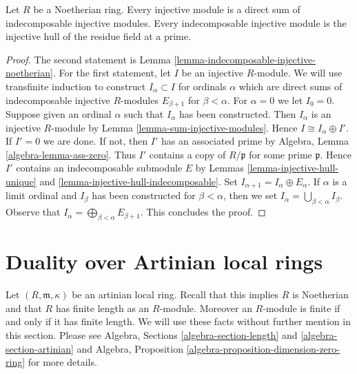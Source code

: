 \begin{proposition}
\label{proposition-structure-injectives-noetherian}
Let $R$ be a Noetherian ring.
Every injective module is a direct sum of indecomposable injective modules.
Every indecomposable injective module is the injective hull of
the residue field at a prime.
\end{proposition}

\begin{proof}
The second statement is Lemma \ref{lemma-indecomposable-injective-noetherian}.
For the first statement, let $I$ be an injective $R$-module.
We will use transfinite induction to construct $I_\alpha \subset I$
for ordinals $\alpha$ which are direct sums of indecomposable injective
$R$-modules $E_{\beta + 1}$ for $\beta < \alpha$.
For $\alpha = 0$ we let $I_0 = 0$. Suppose given an ordinal $\alpha$
such that $I_\alpha$ has been constructed. Then $I_\alpha$ is an
injective $R$-module by Lemma \ref{lemma-sum-injective-modules}.
Hence $I \cong I_\alpha \oplus I'$. If $I' = 0$ we are done.
If not, then $I'$ has an associated prime by
Algebra, Lemma \ref{algebra-lemma-ass-zero}.
Thus $I'$ contains a copy of $R/\mathfrak p$ for some prime $\mathfrak p$.
Hence $I'$ contains an indecomposable submodule $E$ by
Lemmas \ref{lemma-injective-hull-unique} and
\ref{lemma-injective-hull-indecomposable}. Set
$I_{\alpha + 1} = I_\alpha \oplus E_\alpha$.
If $\alpha$ is a limit ordinal and $I_\beta$ has been constructed
for $\beta < \alpha$, then we set
$I_\alpha = \bigcup_{\beta < \alpha} I_\beta$.
Observe that $I_\alpha = \bigoplus_{\beta < \alpha} E_{\beta + 1}$.
This concludes the proof.
\end{proof}



\section{Duality over Artinian local rings}
\label{section-artinian}

\noindent
Let $(R, \mathfrak m, \kappa)$ be an artinian local ring.
Recall that this implies $R$ is Noetherian and that $R$ has finite
length as an $R$-module. Moreover an $R$-module is finite if and
only if it has finite length. We will use these facts without
further mention in this section. Please see
Algebra, Sections \ref{algebra-section-length} and
\ref{algebra-section-artinian}
and
Algebra, Proposition \ref{algebra-proposition-dimension-zero-ring}
for more details.

